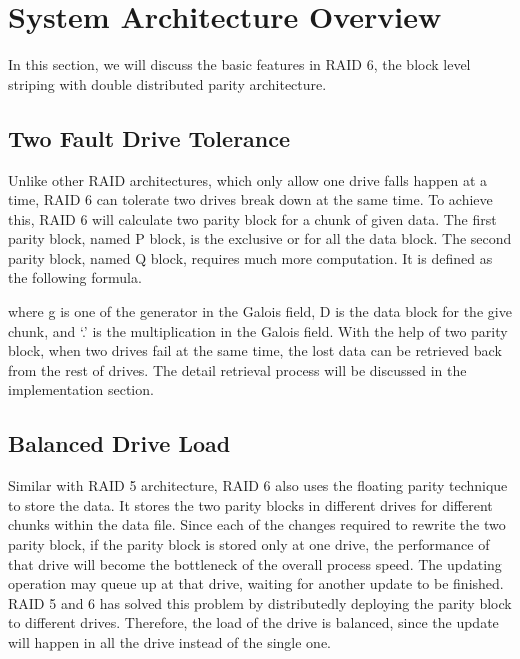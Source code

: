 \section{System Architecture Overview}

In this section, we will discuss the basic features in RAID 6, the block level striping with double distributed parity architecture.

\subsection{Two Fault Drive Tolerance}
Unlike other RAID architectures, which only allow one drive falls happen at a time, RAID 6 can tolerate two drives break down at the same time. To achieve this, RAID 6 will calculate two parity block for a chunk of given data. The first parity block, named P block, is the exclusive or for all the data block. The second parity block, named Q block, requires much more computation. It is defined as the following formula.

where g is one of the generator in the Galois field, D is the data block for the give chunk, and ‘.’ is the multiplication in the Galois field. With the help of two parity block, when two drives fail at the same time, the lost data can be retrieved back from the rest of drives. The detail retrieval process will be discussed in the implementation section.


\subsection{Balanced Drive Load}
Similar with RAID 5 architecture, RAID 6 also uses the floating parity technique to store the data. It stores the two parity blocks in different drives for different chunks within the data file. Since each of the changes required to rewrite the two parity block, if the parity block is stored only at one drive, the performance of that drive will become the bottleneck of the overall process speed. The updating operation may queue up at that drive, waiting for another update to be finished. RAID 5 and 6 has solved this problem by distributedly deploying the parity block to different drives. Therefore, the load of the drive is balanced, since the update will happen in all the drive instead of the single one.

